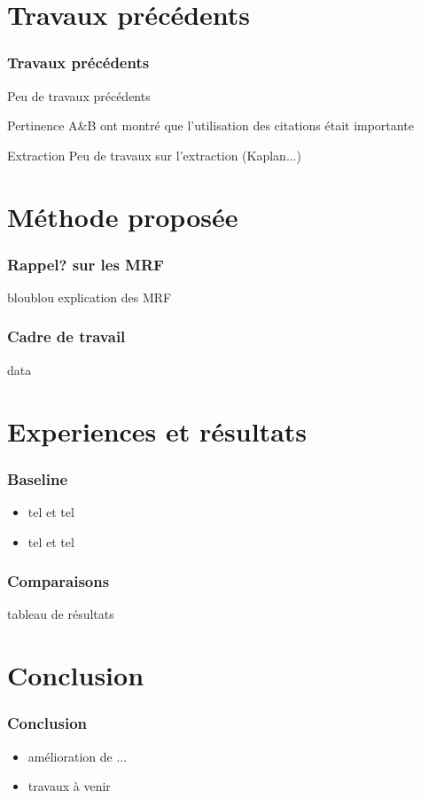 \documentclass[12pt]{beamer}
\begin{document}
\section{Travaux précédents}
\begin{frame}
  \frametitle{Travaux précédents}

  Peu de travaux précédents

  \begin{block}{Pertinence}
  A\&B ont montré que l'utilisation des citations était importante
  \end{block}

  \begin{block}{Extraction}
  Peu de travaux sur l'extraction (Kaplan...)
  \end{block}

\end{frame}

\section{Méthode proposée}
\begin{frame}
  \frametitle{Rappel? sur les MRF}
  \begin{block}{bloublou explication des MRF}
  \end{block}
\end{frame}

\begin{frame}
  \frametitle{Cadre de travail}
  \begin{block}{data}
  \end{block}
\end{frame}

\section{Experiences et résultats}
\begin{frame}
  \frametitle{Baseline}

  \begin{itemize}
    \item tel et tel
    \item tel et tel
  \end{itemize}
\end{frame}

\begin{frame}
  \frametitle{Comparaisons}
  tableau de résultats
\end{frame}

\section{Conclusion}
\begin{frame}
  \frametitle{Conclusion}

  \begin{itemize}
    \item amélioration de ...
    \item travaux à venir
  \end{itemize}
\end{frame}
\end{document}
